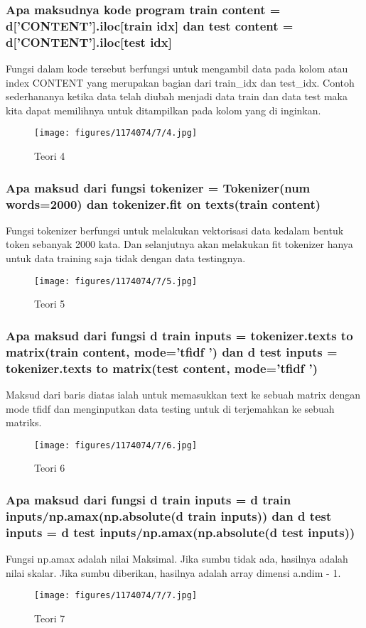 \subsubsection{Apa maksudnya kode program train content = d[’CONTENT’].iloc[train idx] dan test content = d[’CONTENT’].iloc[test idx]}
\hfill\break
Fungsi dalam kode tersebut berfungsi untuk mengambil data pada kolom atau index CONTENT yang merupakan bagian dari train\_idx dan test\_idx. Contoh sederhananya ketika data telah diubah menjadi data train dan data test maka kita dapat memilihnya untuk ditampilkan pada kolom yang di inginkan. 

\begin{figure}[H]
\centering
	\texttt{[image: figures/1174074/7/4.jpg]}
\caption{Teori 4}
\end{figure}

\subsubsection{Apa maksud dari fungsi tokenizer = Tokenizer(num words=2000) dan tokenizer.fit on texts(train content)}
\hfill\break
Fungsi tokenizer berfungsi untuk melakukan vektorisasi data kedalam bentuk token sebanyak 2000 kata. Dan selanjutnya akan melakukan fit tokenizer hanya untuk data training saja tidak dengan data testingnya.
\begin{figure}[H]
\centering
	\texttt{[image: figures/1174074/7/5.jpg]}
\caption{Teori 5}
\end{figure}

\subsubsection{Apa maksud dari fungsi d train inputs = tokenizer.texts to matrix(train content, mode=’tfidf ’) dan d test inputs = tokenizer.texts to matrix(test content, mode=’tfidf ’)}
\hfill\break
Maksud dari baris diatas ialah untuk memasukkan text ke sebuah matrix dengan mode tfidf dan menginputkan data testing untuk di terjemahkan ke sebuah matriks.
\begin{figure}[H]
\centering
	\texttt{[image: figures/1174074/7/6.jpg]}
\caption{Teori 6}
\end{figure}

\subsubsection{Apa maksud dari fungsi d train inputs = d train inputs/np.amax(np.absolute(d train inputs)) dan d test inputs = d test inputs/np.amax(np.absolute(d test inputs))}
\hfill\break
Fungsi np.amax adalah nilai Maksimal. Jika sumbu tidak ada, hasilnya adalah nilai skalar. Jika sumbu diberikan, hasilnya adalah array dimensi a.ndim - 1.
\begin{figure}[H]
\centering
	\texttt{[image: figures/1174074/7/7.jpg]}
\caption{Teori 7}
\end{figure}

